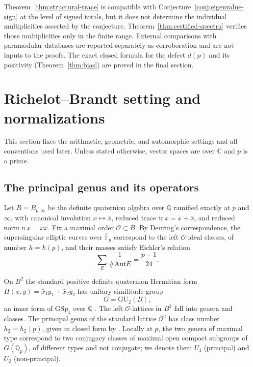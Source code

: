 \documentclass[11pt]{amsart}
\theoremstyle{plain}
\theoremstyle{definition}
\newcommand{\Q}{\mathbb{Q}}
\newcommand{\F}{\mathbb{F}}
\newcommand{\C}{\mathbb{C}}
\newcommand{\GU}{\mathrm{GU}}
\newcommand{\GSp}{\mathrm{GSp}}
\newcommand{\Aut}{\mathrm{Aut}}
\newcommand{\Onorm}{\mathcal{O}}
\begin{document}
	Theorem~\ref{thm:structural-trace} is compatible with
	Conjecture~\ref{conj:eigenvalue-sign} at the level of signed totals, but
	it does not determine the individual multiplicities asserted by the
	conjecture. Theorem~\ref{thm:certified-spectra} verifies those
	multiplicities only in the finite range. External comparisons with
	paramodular databases are reported separately as corroboration and are not
	inputs to the proofs. The exact closed formula for the defect $d(p)$ and
	its positivity (Theorem~\ref{thm:bias}) are proved in the final section.
	
	\section{Richelot--Brandt setting and normalizations}
	\label{sec:prelim}
	
	This section fixes the arithmetic, geometric, and automorphic settings and
	all conventions used later. Unless stated otherwise, vector spaces are over
	$\C$ and $p$ is a prime.
	
	\subsection{The principal genus and its operators}
	\label{ss:principal-genus}
	
	Let $B=B_{p,\infty}$ be the definite quaternion algebra over $\Q$ ramified
	exactly at $p$ and $\infty$, with canonical involution $x\mapsto\bar x$,
	reduced trace $\mathrm{tr}\,x=x+\bar x$, and reduced norm
	$\mathrm{n}\,x=x\bar x$. Fix a maximal order $\Onorm\subset B$. By
	Deuring's correspondence, the supersingular elliptic curves over
	$\overline{\F}_p$ correspond to the left $\Onorm$-ideal classes, of number
	$h=h(p)$, and their masses satisfy Eichler's relation
	\begin{equation}\label{eq:eichler-mass}
		\sum_{E}\frac{1}{\#\Aut E}=\frac{p-1}{24}.
	\end{equation}
	
	On $B^2$ the standard positive definite quaternion Hermitian form \cite{Shimura1963}
	$H(x,y)=\bar x_1y_1+\bar x_2y_2$ has unitary similitude group
	\[
	G=\GU_2(B),
	\]
	an inner form of $\GSp_4$ over $\Q$ \cite{Ibukiyama2007compact}. The left
	$\Onorm$-lattices in $B^2$ fall into genera and classes. The principal
	genus of the standard lattice $\Onorm^2$ has class number $h_2=h_2(p)$,
	given in closed form by \cite{HashimotoIbukiyama}. Locally at $p$, the two
	genera of maximal type correspond to two conjugacy classes of maximal open
	compact subgroups of $G(\Q_p)$, of different types and not conjugate; we
	denote them $U_1$ (principal) and $U_2$ (non-principal).
	
\end{document}
